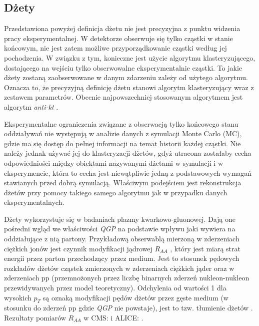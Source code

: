 \subsection{Dżety}
\label{subsec:dzet-def}

Przedstawiona powyżej definicja dżetu nie jest precyzyjna z punktu widzenia pracy eksperymentalnej. W detektorze obserwuje się tylko cząstki w stanie końcowym, nie jest zatem możliwe przyporządkowanie cząstki według jej pochodzenia. W związku z tym, konieczne jest użycie algorytmu klasteryzującego, dostającego na wejściu tylko obserwowalne eksperymentalnie cząstki. 
To jakie dżety zostaną zaobserwowane w danym zdarzeniu zależy od użytego algorytmu. Oznacza to, że precyzyjną definicję dżetu stanowi algorytm klasteryzujący wraz z zestawem parametrów. Obecnie najpowszechniej stosowanym algorytmem jest algorytm \textit{anti-kt} \cite{Cacciari:2008gp}.





Eksperymentalne ograniczenia związane z obserwacją tylko końcowego stanu oddziaływań nie występują w analizie danych z symulacji Monte Carlo (MC), gdzie ma się dostęp do pełnej informacji na temat historii każdej cząstki. 
Nie należy jednak używać jej do klasteryzacji dżetów, gdyż utracona zostałaby cecha odpowiedniości między obiektami nazywanymi dżetami w symulacji i w eksperymencie, która to cecha jest niewątpliwie jedną z podstawowych wymagań stawianych przed dobrą symulacją. Właściwym podejściem jest rekonstrukcja dżetów przy pomocy takiego samego algorytmu jak w przypadku danych eksperymentalnych.

Dżety wykorzystuje się w badaniach plazmy kwarkowo-gluonowej.
Dają one pośredni wgląd we właściwości \textit{QGP} na podstawie wpływu jaki wywiera na oddziałujące z nią partony. 
Przykładową obserwablą mierzoną w zderzeniach ciężkich jonów jest czynnik modyfikacji jądrowej $R_{AA}$ , który jest miarą strat energii przez parton przechodzący przez medium. Jest to stosunek pędowych rozkładów dżetów cząstek zmierzonych w zderzeniach ciężkich jąder oraz w zderzeniach pp (przemnożonych przez liczbę binarnych zderzeń nukleon-nukleon przewidywanych przez model teoretyczny). Odchylenia od wartości 1 dla wysokich $p_T$ są oznaką modyfikacji pędów dżetów przez gęste medium (w stosunku do zderzeń pp gdzie \textit{QGP} nie powstaje), jest to tzw. tłumienie dżetów . Rezultaty pomiarów $R_{AA}$ w CMS: \cite{Khachatryan:2016odn} i ALICE: \cite{Abelev:2012hxa}.

